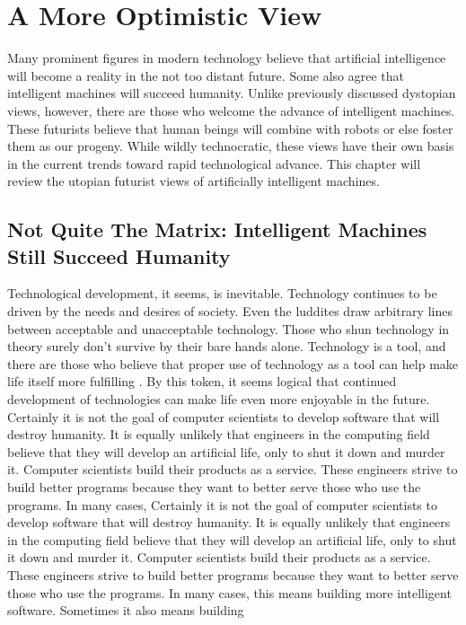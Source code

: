 \chapter{A More Optimistic View}
Many prominent figures in modern technology believe that artificial intelligence
will become a reality in the not too distant future. Some also agree that intelligent
machines will succeed humanity. Unlike previously discussed dystopian views, however,
there are those who welcome the advance of intelligent machines. These futurists believe
that human beings will combine with robots or else foster them as our progeny. While
wildly technocratic, these views have their own basis in the current trends toward rapid
technological advance. This chapter will review the utopian futurist views of artificially
intelligent machines.
\section{Not Quite The Matrix: Intelligent Machines Still Succeed Humanity}
Technological development, it seems, is inevitable. Technology continues to be
driven by the needs and desires of society. Even the luddites draw arbitrary lines
between acceptable and unacceptable technology. Those who shun technology in theory
surely don’t survive by their bare hands alone. Technology is a tool, and there are those
who believe that proper use of technology as a tool can help make life itself more
fulfilling \cite{five}. By this token, it seems logical that continued development of
technologies can make life even more enjoyable in the future.\\
Certainly it is not the goal of computer scientists to develop software that will
destroy humanity. It is equally unlikely that engineers in the computing field believe that
they will develop an artificial life, only to shut it down and murder it. Computer
scientists build their products as a service. These engineers strive to build better
programs because they want to better serve those who use the programs. In many cases, Certainly it is not the goal of computer scientists to develop software that will
destroy humanity. It is equally unlikely that engineers in the computing field believe that
they will develop an artificial life, only to shut it down and murder it. Computer
scientists build their products as a service. These engineers strive to build better
programs because they want to better serve those who use the programs. In many cases, this means building more intelligent software. Sometimes it also means building
